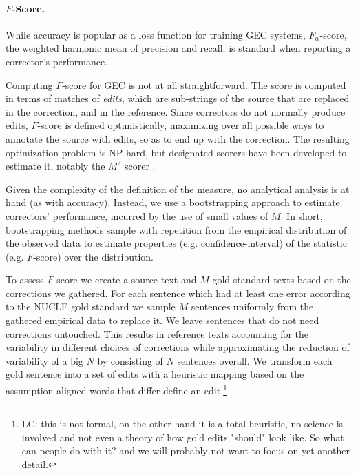 \documentclass[letter,11pt]{article}
\newcommand{\lc}[1]{\footnote{\color{green}LC: #1}}
\begin{document}
		\paragraph{$F$-Score.}
		While accuracy is popular as a loss function for training GEC systems,
		$F_\alpha$-score, the weighted harmonic mean of precision and recall, is standard when reporting a corrector's performance.
		
		Computing $F$-score for GEC is not at all straightforward. The score is computed
		in terms of matches of {\it edits}, which are sub-strings of the source
		that are replaced in the correction, and in the reference. Since correctors
		do not normally produce edits, $F$-score is defined optimistically, maximizing
		over all possible ways to annotate the source with edits, so as to end up with the correction. 
		The resulting optimization problem is NP-hard, but designated scorers
		have been developed to estimate it, notably the $M^2$ scorer 
		\cite{dahlmeier2012better}.
		
		Given the complexity of the definition of the measure, no analytical analysis is at hand (as with accuracy). Instead, we use a bootstrapping
		approach to estimate correctors' performance,
		incurred by the use of small values of $M$.
		In short, bootstrapping methods sample with repetition from the empirical distribution of the observed data to estimate properties (e.g. confidence-interval) of the statistic (e.g. $F$-score) over the distribution. 
		
		To assess $F$ score we create a source text and $M$ gold standard texts based on the corrections we gathered.
		For each sentence which had at least one error according to the NUCLE gold standard we sample $M$ sentences uniformly from the
		gathered empirical data to replace it. We leave sentences that do not need corrections untouched. This results in reference texts accounting for the variability in different choices of corrections while approximating the reduction of variability of a big $N$ by consisting of $N$ sentences overall.
		We transform each gold sentence into a set of edits with a heuristic mapping based on the assumption aligned words that differ define an edit.\lc{this is not formal, on the other hand it is a total heuristic, no science is involved and not even a theory of how gold edits "should" look like. So what can people do with it? and we will probably not want to focus on yet another detail.}
		
\end{document}
